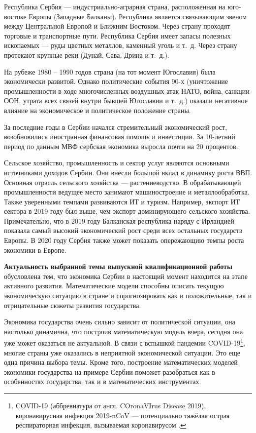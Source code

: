\Introduction

Республика Сербия --- индустриально-аграрная страна, расположенная на юго-востоке Европы (Западные Балканы).
Республика является связывающим звеном между Центральной Европой и Ближним Востоком.
Через страну проходят торговые и транспортные пути.
Республика Сербия имеет запасы полезных ископаемых --- руды цветных металлов, каменный уголь и т.~д.
Через страну протекают крупные реки (Дунай, Сава, Дрина и т.~д.).

На рубеже 1980 -- 1990 годов страна (на тот момент Югославия) была экономически развитой.
Однако политические события 90-х (уничтожение промышленности в ходе многочисленных воздушных атак НАТО, война, санкции ООН, утрата всех связей внутри бывшей Югославии и т.~д.) оказали негативное влияние на экономическое и политическое положение страны.

За последние годы в Сербии начался стремительный экономический рост, возобновились иностранная финансовая помощь и инвестиции.
За 10-летний период по данным МВФ сербская экономика выросла почти на 20 процентов.

Сельское хозяйство, промышленность и сектор услуг являются основными источниками доходов Сербии.
Они внесли большой вклад в динамику роста ВВП.
Основная отрасль сельского хозяйства --- растениеводство.
В обрабатывающей промышленности ведущее место занимают машиностроение и металлообработка.
Также уверенными темпами развиваются ИТ и туризм.
Например, экспорт ИТ сектора в 2019 году был выше, чем экспорт доминирующего сельского хозяйства.
Примечательно, что в 2019 году Балканская республика наряду с Ирландией показала самый высокий экономический рост среди всех остальных государств Европы.
В 2020 году Сербия также может показать опережающию темпы роста экономики в Европе.

\textbf{Актуальность выбранной темы выпускной квалификационной работы } обусловлена тем, что экономика Сербии в настоящий момент находится на этапе активного развития.
Математические модели способны описать текущую экономическую ситуацию в стране и спрогнозировать как и положительные, так и отрицательные сюжеты развития государства.

Экономика государства очень сильно зависит от политической ситуации, она настолько динамична, что построив математическую модель вчера, сегодня она уже может оказаться не актуальной. В связи с вспышкой пандемии COVID-19\footnote{COVID-19 (аббревиатура от англ. COronaVIrus Disease 2019), коронавирусная инфекция 2019-nCoV --- потенциально тяжёлая острая респираторная инфекция, вызываемая коронавирусом \cite{wiki:Coronavirus_disease_2019}.}, многие страны уже оказались в неприятной экономической ситуации.
Это еще одна причина выбора темы.
Кроме того, построение математических моделей экономики государства на примере Сербии поможет разобраться как в особенностях государства, так и в математических инструментах.

